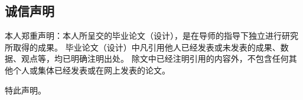 \begin{spacing}{2}

\section*{诚信声明}

{本人郑重声明：本人所呈交的毕业论文（设计），是在导师的指导下独立进行研究所取得的成果。
毕业论文（设计）中凡引用他人已经发表或未发表的成果、数据、观点等，均已明确注明出处。
除文中已经注明引用的内容外，不包含任何其他个人或集体已经发表或在网上发表的论文。

特此声明。}
\end{spacing}
\newpage
